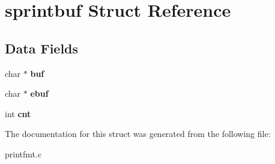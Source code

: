 \hypertarget{structsprintbuf}{}\section{sprintbuf Struct Reference}
\label{structsprintbuf}
\subsection*{Data Fields}
\begin{DoxyCompactItemize}
\item 
\mbox{\label{structsprintbuf_a73c3ae0ec99def51340175cb60059e27}} 
char $\ast$ {\bfseries buf}
\item 
\mbox{\label{structsprintbuf_a792c357caab86cb2bdf2e6e8f1831bcc}} 
char $\ast$ {\bfseries ebuf}
\item 
\mbox{\label{structsprintbuf_ae554d82663f5939b5fd5369d80a4910c}} 
int {\bfseries cnt}
\end{DoxyCompactItemize}


The documentation for this struct was generated from the following file\+:\begin{DoxyCompactItemize}
\item 
printfmt.\+c\end{DoxyCompactItemize}
